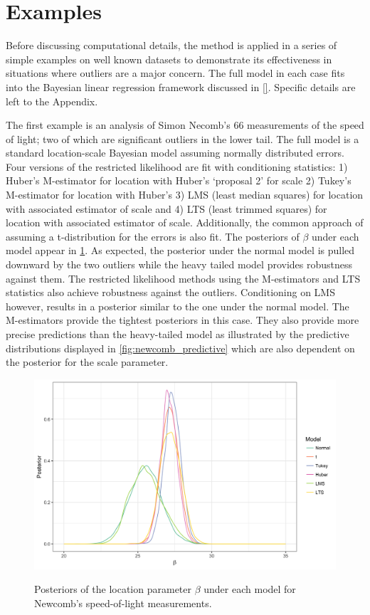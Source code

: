 \documentclass[11pt]{article}
\begin{document}
\section{Examples}
\label{examples}
Before discussing computational details, the method is applied in a series of simple examples on well known datasets to demonstrate its effectiveness in situations where outliers are a major concern. The full model in each case fits into the Bayesian linear regression framework discussed in \ref{}. Specific details are left to the Appendix. 

The first example is an analysis of Simon Necomb's 66 measurements of the speed of light; two of which are significant outliers in the lower tail. The full model is a standard location-scale Bayesian model assuming normally distributed errors. Four versions of the restricted likelihood are fit with conditioning statistics: 1) Huber's M-estimator for location with Huber's `proposal 2'  for scale 2)   Tukey's M-estimator for location with Huber's 3) LMS (least median squares) for location with associated estimator of scale and 4) LTS (least trimmed squares)  for location with associated estimator of scale. Additionally, the common approach of assuming a t-distribution for the errors is also fit. The posteriors of $\beta$ under each model appear in \ref{fig:newcomb_beta}. As expected, the posterior under the normal model is pulled downward by the two outliers while the heavy tailed model provides robustness against them. The restricted likelihood methods using the M-estimators and LTS statistics also achieve robustness against the outliers. Conditioning on LMS however, results in a posterior similar to the one under the normal model. The M-estimators provide the tightest posteriors in this case. They also provide more precise predictions than the heavy-tailed model as illustrated by the predictive distributions displayed in \ref{fig:newcomb_predictive} which are also dependent on the posterior for the scale parameter.
\begin{figure}
\centering
{\includegraphics[width=\textwidth]{figs/speed_of_light_beta.png}}
\label{fig:newcomb_beta}
\caption{Posteriors of the location parameter $\beta$ under each model for Newcomb's speed-of-light measurements.}
\end{figure}
\end{document}
